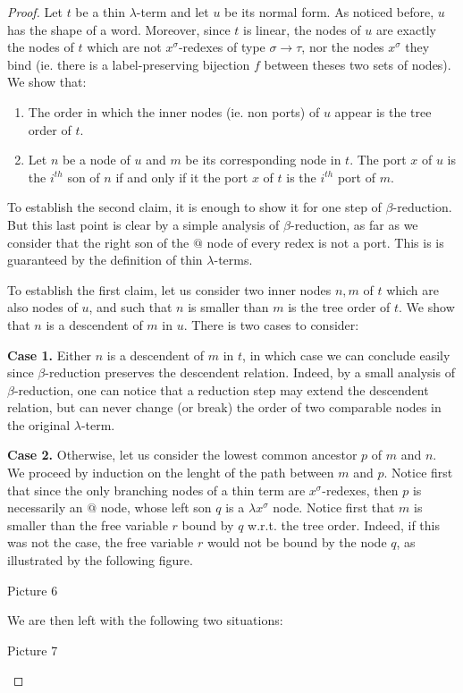\begin{proof}
Let $t$ be a thin $\lambda$-term and let $u$ be its normal form. As noticed before, $u$ has the shape of a word. Moreover, since $t$ is linear, the nodes of $u$ are exactly the nodes of $t$ which are not $x^\sigma$-redexes of type $\sigma\rightarrow\tau$, nor the nodes $x^\sigma$ they bind (ie. there is a label-preserving bijection $f$ between theses two sets of nodes).
We show that:
\noindent \begin{enumerate}
\item The order in which the inner nodes (ie. non ports) of $u$ appear is the tree order of $t$.
\item Let $n$ be a node of $u$ and $m$ be its corresponding node in $t$. The port $x$ of $u$ is the $i^{th}$ son of $n$ if and only if it the port $x$ of $t$ is the $i^{th}$ port of $m$.  
\end{enumerate} 

To establish the second claim, it is enough to show it for one step of $\beta$-reduction. But this last point is clear by a simple analysis of $\beta$-reduction, as far as we consider that the right son of the $\text{@}$ node of every redex is not a port. This is is guaranteed by the definition of thin $\lambda$-terms. 

To establish the first claim, let us consider two inner nodes $n, m$ of $t$ which are also nodes of $u$, and such that $n$ is smaller than $m$ is the tree order of $t$. We show that $n$ is a descendent of $m$ in $u$. There is two cases to consider:

\textbf{Case 1.} Either $n$ is a descendent of $m$ in $t$, in which case we can conclude easily since $\beta$-reduction preserves the descendent relation. Indeed, by a small analysis of $\beta$-reduction, one can notice that a reduction step may extend the descendent relation, but can never change (or break) the order of two comparable nodes in the original $\lambda$-term.    

\textbf{Case 2.} Otherwise, let us consider the lowest common ancestor $p$ of $m$ and $n$. We proceed by induction on the lenght of the path between $m$ and $p$. Notice first that since the only branching nodes of a thin term are $x^\sigma$-redexes, then $p$ is necessarily an $\text{@}$ node, whose left son $q$ is a $\lambda x^\sigma$ node. 
Notice first that $m$ is smaller than the free variable $r$ bound by $q$ w.r.t. the tree order. Indeed, if this was not the case, the free variable $r$ would not be bound by the node $q$, as illustrated by the following figure.
\begin{center}
Picture 6
\end{center}
We are then left with the following two situations:
\begin{center}
Picture 7
\end{center}    


\end{proof}
